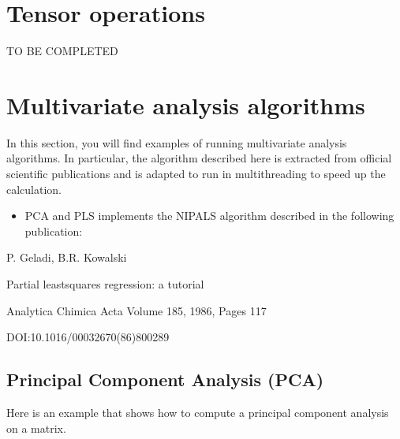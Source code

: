 \documentclass[letterpaper,10pt,english]{sphinxmanual}
\begin{document}
\chapter{Tensor operations}
\label{\detokenize{GettingStartedInC:tensor-operations}}
\sphinxAtStartPar
TO BE COMPLETED


\chapter{Multivariate analysis algorithms}
\label{\detokenize{GettingStartedInC:multivariate-analysis-algorithms}}
\sphinxAtStartPar
In this section, you will find examples of running multivariate analysis algorithms.
In particular, the algorithm described here is extracted from official scientific publications
and is adapted to run in multithreading to speed up the calculation.
\begin{itemize}
\item {} 
\sphinxAtStartPar
PCA and PLS implements the NIPALS algorithm described in the following publication:

\end{itemize}

\begin{DUlineblock}{0em}
\item[] P. Geladi, B.R. Kowalski
\item[] Partial least\sphinxhyphen{}squares regression: a tutorial
\item[] Analytica Chimica Acta Volume 185, 1986, Pages 1\sphinxhyphen{}17
\item[] DOI:10.1016/0003\sphinxhyphen{}2670(86)80028\sphinxhyphen{}9
\end{DUlineblock}


\section{Principal Component Analysis (PCA)}
\label{\detokenize{GettingStartedInC:principal-component-analysis-pca}}
\sphinxAtStartPar
Here is an example that shows how to compute a principal component analysis on a matrix.
\end{document}
